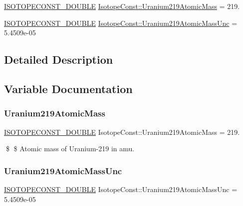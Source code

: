 \begin{DoxyCompactItemize}
\item 
\mbox{\hyperlink{group___isotope_const-_macros_ga8f45a7272ce02c0b4c65c44636ed719a}{I\+S\+O\+T\+O\+P\+E\+C\+O\+N\+S\+T\+\_\+\+D\+O\+U\+B\+LE}} \mbox{\hyperlink{group___isotope_const-_uranium-_u219_ga397edf08d107cab5cf420a27b331efd1}{Isotope\+Const\+::\+Uranium219\+Atomic\+Mass}} = 219.
\item 
\mbox{\hyperlink{group___isotope_const-_macros_ga8f45a7272ce02c0b4c65c44636ed719a}{I\+S\+O\+T\+O\+P\+E\+C\+O\+N\+S\+T\+\_\+\+D\+O\+U\+B\+LE}} \mbox{\hyperlink{group___isotope_const-_uranium-_u219_ga22676df203bfa328c54bc2ea942df871}{Isotope\+Const\+::\+Uranium219\+Atomic\+Mass\+Unc}} = 5.\+4509e-\/05
\end{DoxyCompactItemize}


\subsection{Detailed Description}


\subsection{Variable Documentation}
\mbox{\label{group___isotope_const-_uranium-_u219_ga397edf08d107cab5cf420a27b331efd1}} 
\subsubsection{\texorpdfstring{Uranium219\+Atomic\+Mass}{Uranium219AtomicMass}}
{\footnotesize\ttfamily \mbox{\hyperlink{group___isotope_const-_macros_ga8f45a7272ce02c0b4c65c44636ed719a}{I\+S\+O\+T\+O\+P\+E\+C\+O\+N\+S\+T\+\_\+\+D\+O\+U\+B\+LE}} Isotope\+Const\+::\+Uranium219\+Atomic\+Mass = 219.}

\$ \$ Atomic mass of Uranium-\/219 in amu. \mbox{\label{group___isotope_const-_uranium-_u219_ga22676df203bfa328c54bc2ea942df871}} 
\subsubsection{\texorpdfstring{Uranium219\+Atomic\+Mass\+Unc}{Uranium219AtomicMassUnc}}
{\footnotesize\ttfamily \mbox{\hyperlink{group___isotope_const-_macros_ga8f45a7272ce02c0b4c65c44636ed719a}{I\+S\+O\+T\+O\+P\+E\+C\+O\+N\+S\+T\+\_\+\+D\+O\+U\+B\+LE}} Isotope\+Const\+::\+Uranium219\+Atomic\+Mass\+Unc = 5.\+4509e-\/05}

